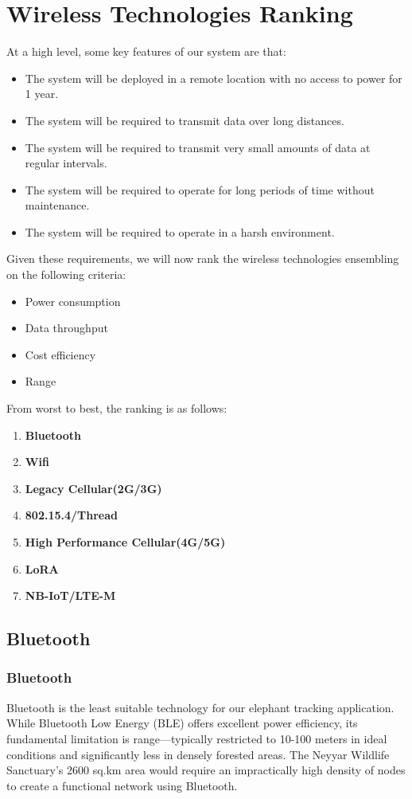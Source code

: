 \section{Wireless Technologies Ranking}

At a high level, some key features of our system are that:
\begin{itemize}
    \item The system will be deployed in a remote location with no access to power for 1 year.
    \item The system will be required to transmit data over long distances.
    \item The system will be required to transmit very small amounts of data at regular intervals.
    \item The system will be required to operate for long periods of time without maintenance.
    \item The system will be required to operate in a harsh environment.
\end{itemize}

Given these requirements, we will now rank the wireless technologies ensembling on the following criteria:
\begin{itemize}
    \item Power consumption
    \item Data throughput
    \item Cost efficiency
    \item Range
\end{itemize}

From worst to best, the ranking is as follows:
\begin{enumerate}
    \item \textbf{Bluetooth}
    \item \textbf{Wifi}
    \item \textbf{Legacy Cellular(2G/3G)}
    \item \textbf{802.15.4/Thread}
    \item \textbf{High Performance Cellular(4G/5G)}
    \item \textbf{LoRA}
    \item \textbf{NB-IoT/LTE-M}
\end{enumerate}

\subsection{Bluetooth}
\subsubsection{Bluetooth}
Bluetooth is the least suitable technology for our elephant tracking application. While Bluetooth Low Energy (BLE) offers excellent power efficiency, its fundamental limitation is range—typically restricted to 10-100 meters in ideal conditions and significantly less in densely forested areas. The Neyyar Wildlife Sanctuary's 2600 sq.km area would require an impractically high density of nodes to create a functional network using Bluetooth.

